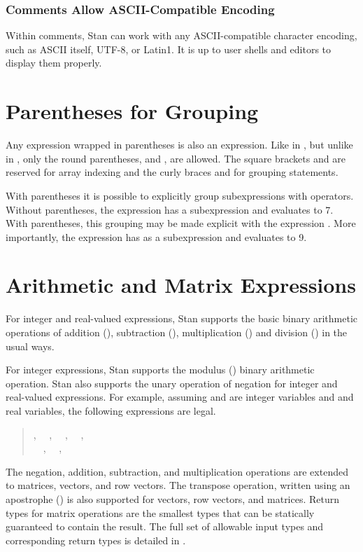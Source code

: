 \subsubsection{Comments Allow ASCII-Compatible Encoding}

Within comments, Stan can work with any ASCII-compatible character
encoding, such as ASCII itself, UTF-8, or Latin1.  It is up to user
shells and editors to display them properly.


\section{Parentheses for Grouping}

Any expression wrapped in parentheses is also an expression. Like in
\Cpp, but unlike in \R, only the round parentheses, \code{(} and
\code{)}, are allowed.  The square brackets \code{[} and \code{]} are
reserved for array indexing and the curly braces \code{\{} and
\code{\}} for grouping statements.

With parentheses it is possible to explicitly group subexpressions
with operators.  Without parentheses, the expression 
has a subexpression  and evaluates to 7.  With
parentheses, this grouping may be made explicit with the expression
.  More importantly, the expression  has  as a subexpression and evaluates to 9.


\section{Arithmetic and Matrix Expressions}\label{arithmetic-expressions.section}

For integer and real-valued expressions, Stan supports the basic
binary arithmetic operations of addition (\code{+}), subtraction
(\code{-}), multiplication (\code{*}) and division (\code{/}) in the
usual ways.

For integer expressions, Stan supports the modulus (\code{\%}) binary
arithmetic operation.  Stan also supports the unary operation of
negation for integer and real-valued expressions.  For example,
assuming  and  are integer variables and  and
 real variables, the following expressions are legal.
%
\begin{quote}
,
\ \ ,
\ \ ,
\ \ ,
\\
\ \ ,
\ \ ,
\ \ 
\end{quote}
%
The negation, addition, subtraction, and multiplication operations are
extended to matrices, vectors, and row vectors.  The transpose
operation, written using an apostrophe () is also supported
for vectors, row vectors, and matrices.  Return types for matrix
operations are the smallest types that can be statically guaranteed to
contain the result.  The full set of allowable input types and
corresponding return types is detailed in
.

